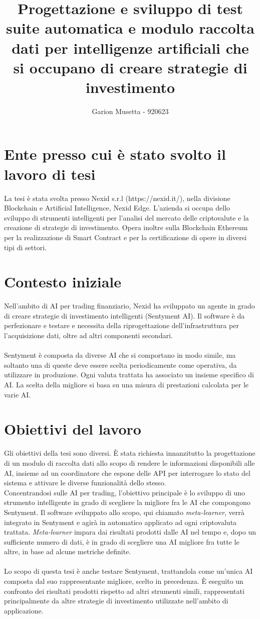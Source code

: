\documentclass{article}
\title{\textbf{Progettazione e sviluppo di test suite automatica e modulo raccolta dati per intelligenze artificiali che si occupano di creare strategie di investimento}}
\author{Garion Musetta - 920623}
\begin{document}
\maketitle

\section{Ente presso cui è stato svolto il lavoro di tesi}
La tesi è stata svolta presso Nexid s.r.l (https://nexid.it/), nella divisione Blockchain e Artificial Intelligence, Nexid Edge. L'azienda si occupa dello sviluppo di strumenti intelligenti per l'analisi del mercato delle criptovalute e la creazione di strategie di investimento. Opera inoltre sulla Blockchain Ethereum per la realizzazione di Smart Contract e per la certificazione di opere in diversi tipi di settori.

\section{Contesto iniziale}
Nell'ambito di AI per trading finanziario, Nexid ha sviluppato un agente in grado di creare strategie di investimento intelligenti (Sentyment AI). Il software è da perfezionare e testare e necessita della riprogettazione dell'infrastruttura per l'acquisizione dati, oltre ad altri componenti secondari.\\~\\ Sentyment è composta da diverse AI che si comportano in modo simile, ma soltanto una di queste deve essere scelta periodicamente come operativa, da utilizzare in produzione. Ogni valuta trattata ha associato un insieme specifico di AI. La scelta della migliore si basa su una misura di prestazioni calcolata per le varie AI.

\section{Obiettivi del lavoro}
Gli obiettivi della tesi sono diversi. È stata richiesta innanzitutto la progettazione di un modulo di raccolta dati allo scopo di rendere le informazioni disponibili alle AI, insieme ad un coordinatore che espone delle API per interrogare lo stato del sistema e attivare le diverse funzionalità dello stesso.\\ Concentrandosi sulle AI per trading, l'obiettivo principale è lo sviluppo di uno strumento intelligente in grado di scegliere la migliore fra le AI che compongono Sentyment. Il software sviluppato allo scopo, qui chiamato \textit{meta-learner}, verrà integrato in Sentyment e agirà in automatico applicato ad ogni criptovaluta trattata. \textit{Meta-learner} impara dai risultati prodotti dalle AI nel tempo e, dopo un sufficiente numero di dati, è in grado di scegliere una AI migliore fra tutte le altre, in base ad alcune metriche definite.\\~\\ Lo scopo di questa tesi è anche testare Sentyment, trattandola come un'unica AI composta dal suo rappresentante migliore, scelto in precedenza. È eseguito un confronto dei risultati prodotti rispetto ad altri strumenti simili, rappresentati principalmente da altre strategie di investimento utilizzate nell'ambito di applicazione.
\end{document}
